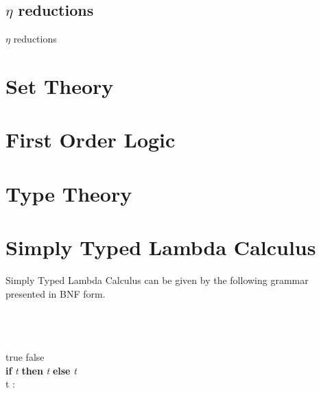 \documentclass[a4paper,11pt]{article}
\begin{document}
\subsection{$\eta$ reductions}
$\eta$ reductions

\section{Set Theory}

\section{First Order Logic}

\section{Type Theory}


\section{\bf{Simply Typed Lambda Calculus}}
Simply Typed Lambda Calculus can be given by the following grammar presented in BNF form. 
\begin{bnf*}
   \bnfsk {}  \\ 
  \bnfmore \bnfor {}  \\
  \bnfmore \bnfor {}  \\ 
  \bnfmore \bnfor true \bnfor false \\ 
  \bnfmore \bnfor \textbf{if} \textit{ t } \textbf{then} \textit{ t } \textbf{else} \textit{ t } \\ 
  \bnfmore \bnfor t : \tau \\ 
  \bnfprod{$\tau$} 
   \\ 
  \bnfmore \bnfor \bnfpn{$\tau \rightarrow \tau$} 
\end{bnf*}
\end{document}
